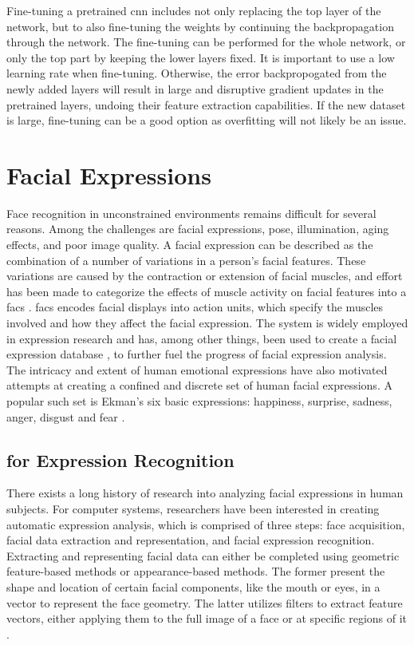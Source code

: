 Fine-tuning a pretrained \acrshort{cnn} includes not only replacing the top layer of the network, but to also fine-tuning the weights by continuing the backpropagation through the network. The fine-tuning can be performed for the whole network, or only the top part by keeping the lower layers fixed. It is important to use a low learning rate when fine-tuning. Otherwise, the error backpropogated from the newly added layers will result in large and disruptive gradient updates in the pretrained layers, undoing their feature extraction capabilities. If the new dataset is large, fine-tuning can be a good option as overfitting will not likely be an issue. 

\section{Facial Expressions} \label{sec:facial-expressions} %

Face recognition in unconstrained environments remains difficult for several reasons. Among the challenges are facial expressions, pose, illumination, aging effects, and poor image quality. A facial expression can be described as the combination of a number of variations in a person's facial features. These variations are caused by the contraction or extension of facial muscles, and effort has been made to categorize the effects of muscle activity on facial features into a \acrfull{facs} \cite{facs}. \acrshort{facs} encodes facial displays into action units, which specify the muscles involved and how they affect the facial expression. The system is widely employed in expression research and has, among other things, been used to create a facial expression database \cite{exp-db}, to further fuel the progress of facial expression analysis. The intricacy and extent of human emotional expressions have also motivated attempts at creating a confined and discrete set of human facial expressions. A popular such set is Ekman's six basic expressions: happiness, surprise, sadness, anger, disgust and fear \cite{ekman}.

\subsection{ for Expression Recognition}

There exists a long history of research into analyzing facial expressions in human subjects. For computer systems, researchers have been interested in creating automatic expression analysis, which is comprised of three steps: face acquisition, facial data extraction and representation, and facial expression recognition. Extracting and representing facial data can either be completed using geometric feature-based methods or appearance-based methods. The former present the shape and location of certain facial components, like the mouth or eyes, in a vector to represent the face geometry. The latter utilizes filters to extract feature vectors, either applying them to the full image of a face or at specific regions of it \cite{exp-rec-book}. \\

